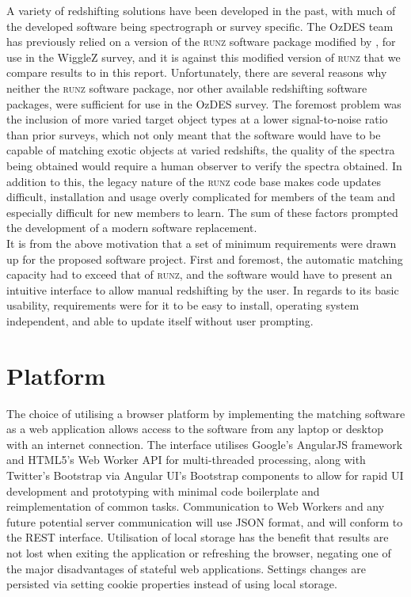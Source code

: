 \documentclass[iop]{emulateapj}
\newcommand{\runz}{\textsc{runz}}
\begin{document}
A variety of redshifting solutions have been developed in the past, with much of the developed software being spectrograph or survey specific. The OzDES team has previously relied on a version of the \runz{} software package modified by \citet{saunders2004}, for use in the WiggleZ survey, and it is against this modified version of \runz{} that we compare results to in this report.  Unfortunately, there are several reasons why neither the \runz{} software package, nor other available redshifting software packages, were sufficient for use in the OzDES survey. The foremost problem was the inclusion of more varied target object types at a lower signal-to-noise ratio than prior surveys, which not only meant that the software would have to be capable of matching exotic objects at varied redshifts, the quality of the spectra being obtained would require a human observer to verify the spectra obtained. In addition to this, the legacy nature of the \runz{} code base makes code updates difficult, installation and usage overly complicated for members of the team and especially difficult for new members to learn. The sum of these factors prompted the development of a modern software replacement.\\

It is from the above motivation that a set of minimum requirements were drawn up for the proposed software project. First and foremost, the automatic matching capacity had to exceed that of \runz{}, and the software would have to present an intuitive interface to allow manual redshifting by the user. In regards to its basic usability, requirements were for it to be easy to install, operating system independent, and able to update itself without user prompting. 



\section{Platform}

The choice of utilising a browser platform by implementing the matching software as a web application allows access to the software from any laptop or desktop with an internet connection. The interface utilises Google's AngularJS framework and HTML5's Web Worker API for multi-threaded processing, along with Twitter's Bootstrap via Angular UI's Bootstrap components to allow for rapid UI development and prototyping with minimal code boilerplate and reimplementation of common tasks. Communication to Web Workers and any future potential server communication will use JSON format, and will conform to the REST interface. Utilisation of local storage has the benefit that results are not lost when exiting the application or refreshing the browser, negating one of the major disadvantages of stateful web applications. Settings changes are persisted via setting cookie properties instead of using local storage.\\
\end{document}
